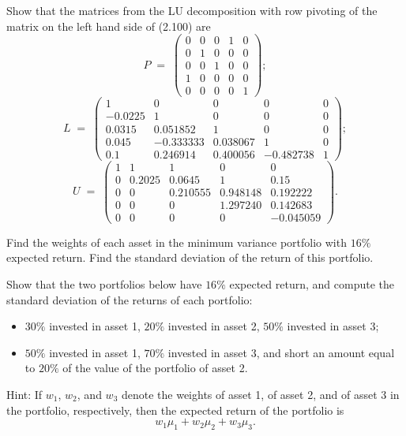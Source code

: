 \begin{exercises}
\begin{subparts}
Show that the matrices from the LU decomposition with row pivoting of the matrix on
the left hand side of (2.100) are
\[
P \;=\; \begin{pmatrix}
0&0&0&1&0\\
0&1&0&0&0\\
0&0&1&0&0\\
1&0&0&0&0\\
0&0&0&0&1
\end{pmatrix};
\]
\[
L \;=\; \begin{pmatrix}
1 & 0 & 0 & 0 & 0\\
-0.0225 & 1 & 0 & 0 & 0\\
0.0315 & 0.051852 & 1 & 0 & 0\\
0.045 & -0.333333 & 0.038067 & 1 & 0\\
0.1 & 0.246914 & 0.400056 & -0.482738 & 1
\end{pmatrix};
\]
\[
U \;=\; \begin{pmatrix}
1 & 1 & 1 & 0 & 0\\
0 & 0.2025 & 0.0645 & 1 & 0.15\\
0 & 0 & 0.210555 & 0.948148 & 0.192222\\
0 & 0 & 0 & 1.297240 & 0.142683\\
0 & 0 & 0 & 0 & -0.045059
\end{pmatrix}.
\]
\item Find the weights of each asset in the minimum variance portfolio with $16\%$
expected return. Find the standard deviation of the return of this portfolio.
\item Show that the two portfolios below have $16\%$ expected return, and compute
the standard deviation of the returns of each portfolio:
\begin{itemize}
\item $30\%$ invested in asset 1, $20\%$ invested in asset 2, $50\%$ invested in
asset 3;
\item $50\%$ invested in asset 1, $70\%$ invested in asset 3, and short an amount
equal to $20\%$ of the value of the portfolio of asset 2.
\end{itemize}

\noindent Hint: If $w_1$, $w_2$, and $w_3$ denote the weights of asset 1, of asset
2, and of asset 3 in the portfolio, respectively, then the expected return of the
portfolio is
\[
w_1\mu_1 + w_2\mu_2 + w_3\mu_3.
\]
\end{subparts}

\end{exercises}

